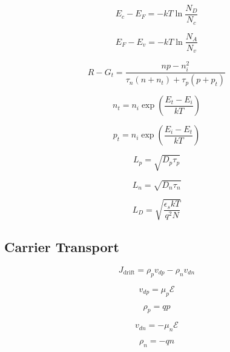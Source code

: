 \documentclass{infosheet}
\begin{document}
\begin{multicols}{2}
  \begin{displaymath}
    E_c-E_F = -kT\ln\frac{N_D}{N_c}
  \end{displaymath}
  
  \begin{displaymath}
    E_F-E_v = -kT\ln\frac{N_A}{N_v}
  \end{displaymath}
\end{multicols}

\begin{displaymath}
  R-G_t = \frac{np-n_i^2}{\tau_n(n+n_t) + \tau_p(p+p_t)}
\end{displaymath}

\begin{multicols}{2}
  \begin{displaymath}
    n_t = n_i\exp\left(\frac{E_t-E_i}{kT}\right)
  \end{displaymath}
  
  \begin{displaymath}
    p_t = n_i\exp\left(\frac{E_i-E_t}{kT}\right)
  \end{displaymath}
\end{multicols}

\begin{multicols}{3}
  \begin{displaymath}
    L_p = \sqrt{D_p\tau_p}
  \end{displaymath}
  
  \begin{displaymath}
    L_n = \sqrt{D_n\tau_n}
  \end{displaymath}
  
  \begin{displaymath}
    L_D = \sqrt{\frac{\epsilon_skT}{q^2N}}
  \end{displaymath}
\end{multicols}

\subsection{Carrier Transport}

\begin{displaymath}
  J_\text{drift} = \rho_p v_{dp} - \rho_n v_{dn}
\end{displaymath}

\begin{multicols}{2}
  \begin{displaymath}
    v_{dp} = \mu_p\mathcal{E}
  \end{displaymath}
  
  \begin{displaymath}
    \rho_p = qp
  \end{displaymath}

  \begin{displaymath}
    v_{dn} = -\mu_n\mathcal{E}
  \end{displaymath}
  
  \begin{displaymath}
    \rho_n = -qn
  \end{displaymath}
\end{multicols}
\end{document}
